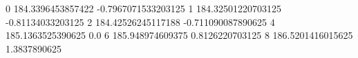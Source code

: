 0 184.3396453857422 -0.7967071533203125
1 184.32501220703125 -0.81134033203125
2 184.42526245117188 -0.711090087890625
4 185.1363525390625 0.0
6 185.948974609375 0.8126220703125
8 186.5201416015625 1.3837890625
